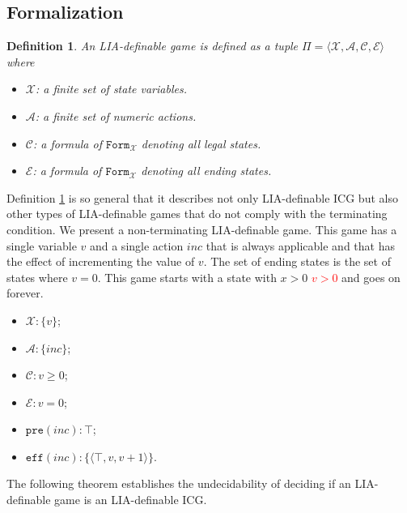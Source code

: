 \documentclass[review]{elsarticle}
\newcommand{\formula}{\mathtt{Form}}
\newcommand{\set}[1]{\{ #1 \}}
\newcommand{\tuple}[1]{\langle {#1} \rangle}
\newcommand{\true}{\top}
\newcommand{\statevar}{\mathcal{X}}
\newcommand{\act}{\mathcal{A}}
\newcommand{\constraint}{\mathcal{C}}
\newcommand{\estate}{\mathcal{E}}
\newcommand{\pre}{\mathtt{pre}}
\newcommand{\eff}{\mathtt{eff}}
\newtheorem{definition}{Definition}
\begin{document}
	\subsection{Formalization}
	\begin{definition} \label{def:game} \rm
		An LIA-definable game is defined as a tuple $\Pi = \tuple{\statevar, \act, \constraint, \estate}$ where 
		\begin{itemize}
			\item $\statevar$: a finite set of state variables. 
			\item $\act$: a finite set of numeric actions.			
			\item $\constraint$: a formula of $\formula_{\statevar}$ denoting all legal states.
			\item $\estate$: a formula of $\formula_{\statevar}$ denoting all ending states. 
		\end{itemize}
	\end{definition}
	
	Definition \ref{def:game} is so general that it describes not only LIA-definable ICG but also other types of LIA-definable games that do not comply with the terminating condition.
	We present a non-terminating LIA-definable game.
	This game has a single variable $v$ and a single action $inc$ that is always applicable and that has the effect of incrementing the value of $v$.
	The set of ending states is the set of states where $v = 0$.
	This game starts with a state with $x > 0$ \textcolor{red}{$v > 0$} and goes on forever.
	\begin{itemize}		    
		\item $\statevar: \set{v}$;
		\item $\act:\set{inc}$;
		\item $\constraint: v \ge 0$;
		\item $\estate: v = 0$;
		\item $\pre(inc): \true$;
		\item $\eff(inc): \set{\tuple{\true, v, v + 1}}$.
	\end{itemize}
	
	The following theorem establishes the undecidability of deciding if an LIA-definable game is an LIA-definable ICG.
	
\end{document}
